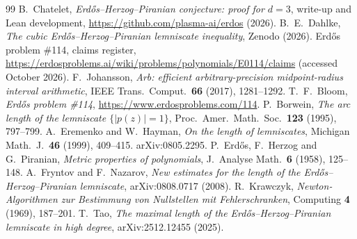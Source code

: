 \documentclass[11pt]{amsart}
\theoremstyle{remark}
\begin{document}
\begin{thebibliography}{99}
 B.~Chatelet, \emph{Erd\H{o}s--Herzog--Piranian conjecture: proof for $d=3$}, write-up and Lean development, \url{https://github.com/plasma-ai/erdos} (2026).
 B.~E.~Dahlke, \emph{The cubic Erd\H{o}s--Herzog--Piranian lemniscate inequality}, Zenodo (2026).
 Erd\H{o}s problem \#114, claims register, \url{https://erdosproblems.ai/wiki/problems/polynomials/E0114/claims} (accessed October 2026).
 F.~Johansson, \emph{Arb: efficient arbitrary-precision midpoint-radius interval arithmetic}, IEEE Trans.\ Comput.\ \textbf{66} (2017), 1281--1292.
 T.~F.~Bloom, \emph{Erd\H{o}s problem \#114}, \url{https://www.erdosproblems.com/114}.
 P.~Borwein, \emph{The arc length of the lemniscate $\{|p(z)|=1\}$}, Proc.\ Amer.\ Math.\ Soc.\ \textbf{123} (1995), 797--799.
 A.~Eremenko and W.~Hayman, \emph{On the length of lemniscates}, Michigan Math.\ J.\ \textbf{46} (1999), 409--415. arXiv:0805.2295.
 P.~Erd\H{o}s, F.~Herzog and G.~Piranian, \emph{Metric properties of polynomials}, J.\ Analyse Math.\ \textbf{6} (1958), 125--148.
 A.~Fryntov and F.~Nazarov, \emph{New estimates for the length of the Erd\H{o}s--Herzog--Piranian lemniscate}, arXiv:0808.0717 (2008).
 R.~Krawczyk, \emph{Newton-Algorithmen zur Bestimmung von Nullstellen mit Fehlerschranken}, Computing \textbf{4} (1969), 187--201.
 T.~Tao, \emph{The maximal length of the Erd\H{o}s--Herzog--Piranian lemniscate in high degree}, arXiv:2512.12455 (2025).
\end{thebibliography}
\end{document}

